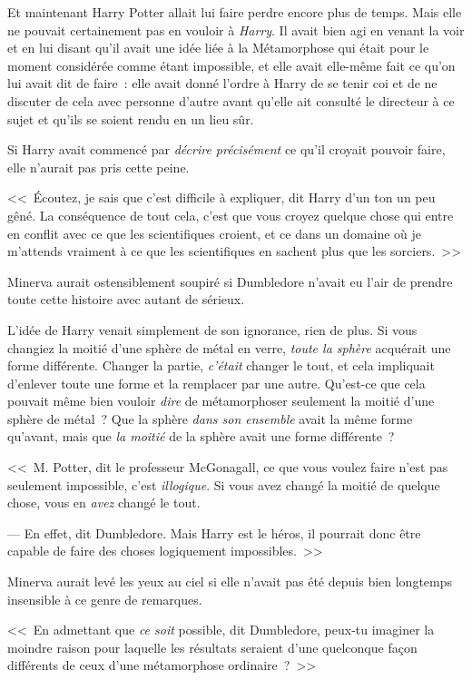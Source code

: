 Et maintenant Harry Potter allait lui faire perdre encore plus de temps. Mais elle ne pouvait certainement pas en vouloir à \emph{Harry}. Il avait bien agi en venant la voir et en lui disant qu'il avait une idée liée à la Métamorphose qui était pour le moment considérée comme étant impossible, et elle avait elle-même fait ce qu'on lui avait dit de faire~: elle avait donné l'ordre à Harry de se tenir coi et de ne discuter de cela avec personne d'autre avant qu'elle ait consulté le directeur à ce sujet et qu'ils se soient rendu en un lieu sûr.

Si Harry avait commencé par \emph{décrire précisément} ce qu'il croyait pouvoir faire, elle n'aurait pas pris cette peine.

<<~Écoutez, je sais que c'est difficile à expliquer, dit Harry d'un ton un peu gêné. La conséquence de tout cela, c'est que vous croyez quelque chose qui entre en conflit avec ce que les scientifiques croient, et ce dans un domaine où je m'attends vraiment à ce que les scientifiques en sachent plus que les sorciers.~>>

Minerva aurait ostensiblement soupiré si Dumbledore n'avait eu l'air de prendre toute cette histoire avec autant de sérieux.

L'idée de Harry venait simplement de son ignorance, rien de plus. Si vous changiez la moitié d'une sphère de métal en verre, \emph{toute la sphère} acquérait une forme différente. Changer la partie, \emph{c'était} changer le tout, et cela impliquait d'enlever toute une forme et la remplacer par une autre. Qu'est-ce que cela pouvait même bien vouloir \emph{dire} de métamorphoser seulement la moitié d'une sphère de métal~? Que la sphère \emph{dans son ensemble} avait la même forme qu'avant, mais que \emph{la moitié} de la sphère avait une forme différente~?

<<~M. Potter, dit le professeur McGonagall, ce que vous voulez faire n'est pas seulement impossible, c'est \emph{illogique}. Si vous avez changé la moitié de quelque chose, vous en \emph{avez} changé le tout.

--- En effet, dit Dumbledore. Mais Harry est le héros, il pourrait donc être capable de faire des choses logiquement impossibles.~>>

Minerva aurait levé les yeux au ciel si elle n'avait pas été depuis bien longtemps insensible à ce genre de remarques.

<<~En admettant que \emph{ce soit} possible, dit Dumbledore, peux-tu imaginer la moindre raison pour laquelle les résultats seraient d'une quelconque façon différents de ceux d'une métamorphose ordinaire~?~>>

